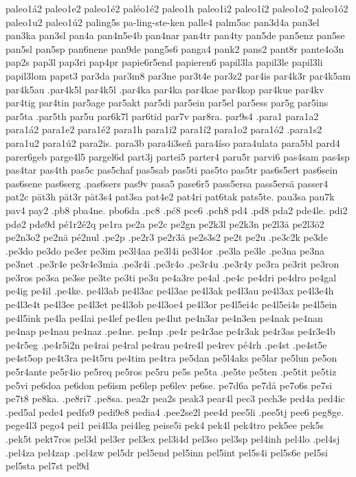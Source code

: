 {{paleo1á2
paleo1e2
paleo1é2
paléo1é2
paleo1h
paleo1i2
paleo1í2
paleo1o2
paleo1ó2
paleo1u2
paleo1ú2
paling5s
pa-ling-ste-ken
palle4
palm5ac
pan3d4a
pan3el
pan3ka
pan3sl
pan4a
pan4n5e4b
pan4nar
pan4tr
pan4ty
pan5de
pan5enz
pan5se
pan5sl
pan5sp
pan6nene
pan9de
pang5s6
panga4
pank2
pans2
pant8r
pante4o3n
pap2s
pap3l
pap3ri
pap4pr
papie6r5end
papieren6
papil3la
papil3le
papil3li
papil3lom
papst3
par3da
par3m8
par3ne
par3t4e
par3z2
par4is
par4k3r
par4k5am
par4k5au
.par4k5l
par4k5l
.par4ka
par4ka
par4kae
par4kop
par4kue
par4kv
par4tig
par4tin
par5age
par5akt
par5di
par5ein
par5el
par5ess
par5g
par5ins
par5ta
.par5th
par5u
par6k7l
par6tid
par7v
par8ra.
par9s4
.para1
para1a2
para1á2
para1e2
para1é2
para1h
para1i2
para1í2
para1o2
para1ó2
.para1s2
para1u2
para1ú2
para2is.
para3b
para4i3señ
para4íso
para4ulata
para5bl
pard4
parer6geb
parge4l5
pargel6d
part3j
partei5
parter4
paru5r
parvi6
pas4sam
pas4sp
pas4tar
pas4th
pas5c
pas5chaf
pas5sab
pas5ti
pas5to
pas5tr
pas6s5ert
pas6sein
pas6sene
pas6serg
.pas6sers
pas9v
pasa5
pase6r5
pass5ersa
pass5ersä
passer4
pat2c
pät3h
pät3r
pät3s4
pat3sa
pat4e2
pat4ri
pat6tak
pats5te.
pau3sa
pau7k
pav4
pay2
.pb8
pba4ne.
pbo6da
.pc8
.pć8
pce6
.pch8
pd4
.pd8
pda2
pde4le.
pdi2
pdø2
pdø9d
pé1r2é2q
pe1ra
pe2a
pe2c
pe2gn
pe2k3l
pe2k3n
pe2l3ä
pe2l3ö2
pe2n3o2
pe2nä
pé2nul
.pe2p
.pe2r3
pe2r3ä
pe2s3s2
pe2t
pe2u
.pe3c2k
pe3de
.pe3do
pe3do
pe3er
pe3im
pe3l4aa
pe3l4i
pe3l4or
.pe3la
pe3le
.pe3na
pe3na
pe3net
.pe3r4e
pe3r4e3mia
.pe3r4i
.pe3r4o
.pe3r4u
.pe3r4y
pe3ra
pe3rit
pe3ron
pe3ros
pe3sa
pe3se
pe3te
pe3ti
pe3u
pe4a3re
pe4al
.pe4c
pe4dri
pe4dro
pe4gal
pe4ig
pe4il
.pe4ke.
pe4l3ab
pe4l3ac
pe4l3ae
pe4l3ak
pe4l3au
pe4l3ax
pe4l3e4h
pe4l3e4t
pe4l3ee
pe4l3et
pe4l3ob
pe4l3oe4
pe4l3or
pe4l5ei4c
pe4l5ei4s
pe4l5ein
pe4l5ink
pe4la
pe4lai
pe4lef
pe4leu
pe4lut
pe4n3ar
pe4n3en
pe4nak
pe4nan
pe4nap
pe4nau
pe4naz
.pe4ne.
pe4np
.pe4r
pe4r3ae
pe4r3ak
pe4r3as
pe4r3e4b
pe4r5eg
.pe4r5i2n
pe4rai
pe4ral
pe4rau
pe4re4l
pe4rev
pé4rh
.pe4st
.pe4st5e
pe4st5op
pe4t3ra
pe4t5ru
pe4tim
pe4tra
pe5dan
pe5l4aks
pe5lar
pe5lun
pe5on
pe5r4ante
pe5r4io
pe5req
pe5ros
pe5ru
pe5s
pe5ta
.pe5te
pe5ten
.pe5tit
pe5tiz
pe5vi
pe6doa
pe6don
pe6ism
pe6lep
pe6lev
pe6se.
pe7d6a
pe7då
pe7o6s
pe7si
pe7t8
pe8ka.
.pe8ri7
.pe8sa.
pea2r
pea2s
peak3
pear4l
pec3
pech3e
ped4a
ped4ic
.ped5al
pede4
pedfø9
pedi9e8
pedia4
.pee2se2l
pee4d
pee5li
.pee5tj
pee6
peg8ge.
pege4l3
pego4
pei1
pei4l3a
pei4leg
peise5i
pek4
pek4l
pek4tro
pek5ee
pek5s
.pek5t
pekt7ros
pel3d
pel3er
pel3ex
pel3i4d
pel3so
pel3sp
pel4inh
pel4lo
.pel4sj
.pel4za
pel4zap
.pel4zw
pel5dr
pel5end
pel5inn
pel5int
pel5s4i
pel5s6e
pel5si
pel5sta
pel7st
pel9d
}}
